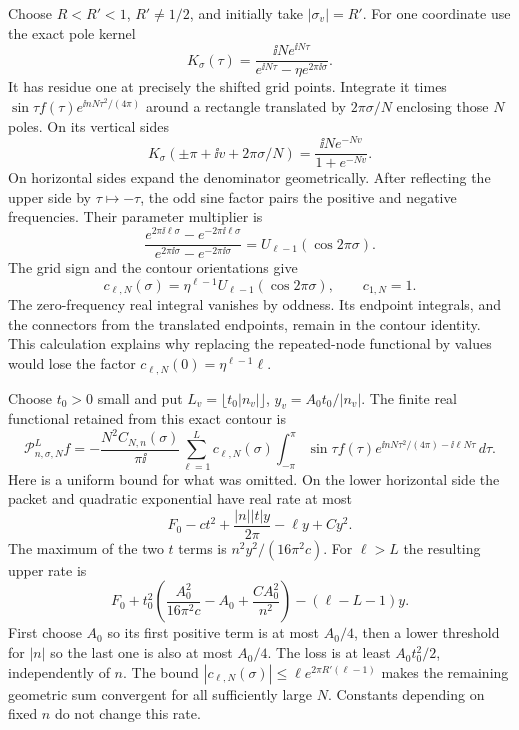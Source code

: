 Choose $R<R'<1$, $R'\ne1/2$, and initially take
$|\sigma_v|=R'$. For one coordinate use the exact pole kernel
\[
 K_\sigma(\tau)=\frac{\ii N e^{\ii N\tau}}
              {e^{\ii N\tau}-\eta e^{2\pi\ii\sigma}}.
\]
It has residue one at precisely the shifted grid points. Integrate
it times $\sin\tau f(\tau)e^{\ii nN\tau^2/(4\pi)}$ around a
rectangle translated by $2\pi\sigma/N$ enclosing those $N$ poles.
On its vertical sides
\[
 K_\sigma(\pm\pi+\ii v+2\pi\sigma/N)
                  =\frac{\ii N e^{-Nv}}{1+e^{-Nv}}.
\]
On horizontal sides expand the denominator geometrically. After
reflecting the upper side by $\tau\mapsto-\tau$, the odd sine
factor pairs the positive and negative frequencies. Their parameter
multiplier is
\[
 \frac{e^{2\pi\ii\ell\sigma}-e^{-2\pi\ii\ell\sigma}}
      {e^{2\pi\ii\sigma}-e^{-2\pi\ii\sigma}}
       =U_{\ell-1}(\cos2\pi\sigma).
\]
The grid sign and the contour orientations give
\begin{equation}\label{ms:charges}
 c_{\ell,N}(\sigma)=\eta^{\ell-1}
                 U_{\ell-1}(\cos2\pi\sigma),\qquad c_{1,N}=1.
\end{equation}
The zero-frequency real integral vanishes by oddness. Its endpoint
integrals, and the connectors from the translated endpoints, remain
in the contour identity. This calculation explains why replacing
the repeated-node functional by values would lose the factor
$c_{\ell,N}(0)=\eta^{\ell-1}\ell$.

Choose $t_0>0$ small and put
$L_v=\lfloor t_0|n_v|\rfloor$, $y_v=A_0t_0/|n_v|$.
The finite real functional retained from this exact contour is
\begin{equation}\label{ms:finite-charges}
 \mathcal P_{n,\sigma,N}^{L}f
 =-\frac{N^2 C_{N,n}(\sigma)}{\pi\ii}
 \sum_{\ell=1}^{L}c_{\ell,N}(\sigma)
 \int_{-\pi}^{\pi}\sin\tau f(\tau)
             e^{\ii nN\tau^2/(4\pi)-\ii\ell N\tau}\,d\tau.
\end{equation}
Here is a uniform bound for what was omitted. On the lower
horizontal side the packet and quadratic exponential have real rate at most
\[
 F_0-ct^2+\frac{|n||t|y}{2\pi}-\ell y+Cy^2.
\]
The maximum of the two $t$ terms is $n^2y^2/(16\pi^2c)$.
For $\ell>L$ the resulting upper rate is
\[
 F_0+t_0^2\left(\frac{A_0^2}{16\pi^2c}-A_0
                         +\frac{CA_0^2}{n^2}\right)
                         -(\ell-L-1)y.
\]
First choose $A_0$ so its first positive term is at most $A_0/4$,
then a lower threshold for $|n|$ so the last one is also at most
$A_0/4$. The loss is at least $A_0t_0^2/2$, independently of $n$.
The bound $|c_{\ell,N}(\sigma)|\le\ell e^{2\pi R'(\ell-1)}$
makes the remaining geometric sum convergent for all sufficiently
large $N$. Constants depending on fixed $n$ do not change this rate.

